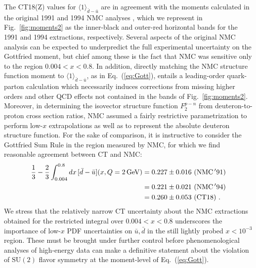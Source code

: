 The CT18(Z) values for $\langle 1 \rangle_{\bar{d}-\bar{u}}$ are in agreement with the moments calculated in the original 1991 and 1994 NMC analyses
\cite{Amaudruz:1991at,Arneodo:1994sh}, which we represent in Fig.~\ref{fig:moments2} as the inner-black and outer-red horizontal bands for the
1991 \cite{Amaudruz:1991at} and 1994 \cite{Arneodo:1994sh} extractions, respectively. Several aspects of the original NMC analysis can be expected
to underpredict the full experimental uncertainty on the Gottfried moment, but chief among these is the fact that NMC was sensitive only to the
region $0.004\! <\! x\! <\! 0.8$. In addition, directly matching the NMC structure function moment to $\langle 1 \rangle_{\bar{d}-\bar{u}}$, as in
Eq.~(\ref{eq:Gott}), entails a leading-order quark-parton calculation which necessarily induces corrections from missing higher orders and other QCD
effects not contained in the bands of Fig.~\ref{fig:moments2}. Moreover, in determining the isovector structure function $F^{p-n}_2$ from deuteron-to-proton cross section ratios,
NMC assumed a fairly restrictive parametrization to perform low-$x$ extrapolations as well as to represent the absolute deuteron structure function.
For the sake of comparison, it is instructive to consider the Gottfried Sum Rule in the region measured by NMC, for which we find reasonable agreement
between CT and NMC:
\begin{align}
	\frac{1}{3} - \frac{2}{3}\int_{0.004}^{0.8} dx\, [\bar{d}-\bar{u}](x,\Q=2\,\mathrm{GeV}) &= 0.227 \pm 0.016\ (\mathrm{NMC\, '91 }) \\
											       &= 0.221 \pm 0.021\ (\mathrm{NMC\, '94 }) \\
											       &= 0.260 \pm 0.053\ (\mathrm{CT18})\ .
\end{align}
We stress that the relatively narrow CT uncertainty about the NMC extractions obtained for the restricted integral over $0.004\! <\! x\! <\! 0.8$ underscores the
importance of low-$x$ PDF uncertainties on $\bar{u}, \bar{d}$ in the still lightly probed $x\! <\! 10^{-3}$ region. These must be brought under further control before
phenomenological analyses of high-energy data can make a definitive statement about the violation of $\mathrm{SU}(2)$ flavor symmetry at the moment-level of
Eq.~(\ref{eq:Gott}).

